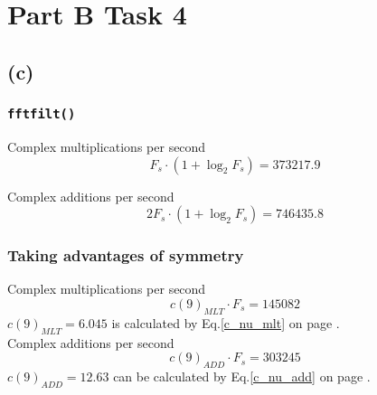 \documentclass{article}
\newenvironment{homeworkProblem}[1]{
	\section*{#1}
	}{
}
\newenvironment{homeworkSection}[1]{
	\subsection*{#1}
	}{
}
\begin{document}
\begin{homeworkProblem}{Part B Task 4}
\begin{homeworkSection}{(c)}
\subsubsection*{\texttt{fftfilt()}}
Complex multiplications per second
\begin{equation}
F_s \cdot (1 + \log_2 F_s) = 373217.9
\end{equation}

Complex additions per second
\begin{equation}
2F_s \cdot (1 + \log_2 F_s) = 746435.8
\end{equation}

\subsubsection*{Taking advantages of symmetry}
Complex multiplications per second
\begin{equation}
c(9)_{MLT} \cdot F_s = 145082
\end{equation}
$c(9)_{MLT} = 6.045$ is calculated by Eq.\ref{c_nu_mlt} on page \pageref{c_nu_mlt}.\\

Complex additions per second
\begin{equation}
c(9)_{ADD} \cdot F_s = 303245
\end{equation}
$c(9)_{ADD} = 12.63$ can be calculated by Eq.\ref{c_nu_add} on page \pageref{c_nu_add}.

\end{homeworkSection}


\end{homeworkProblem}

\end{document}
